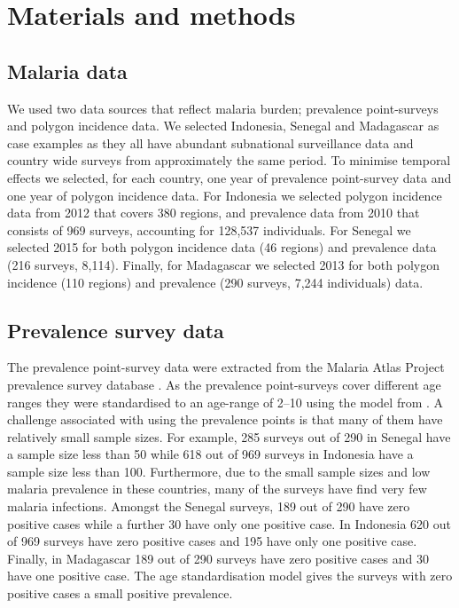 \documentclass[10pt,letterpaper]{article}
\begin{document}
\section*{Materials and methods}


\subsection*{Malaria data}

We used two data sources that reflect malaria burden; prevalence point-surveys and polygon incidence data.
We selected Indonesia, Senegal and Madagascar as case examples as they all have abundant subnational surveillance data and country wide surveys from approximately the same period.
To minimise temporal effects we selected, for each country, one year of prevalence point-survey data and one year of polygon incidence data.
For Indonesia we selected polygon incidence data from 2012 that covers 380 regions, and prevalence data from 2010 that consists of 969 surveys, accounting for 128,537 individuals.
For Senegal we selected 2015 for both polygon incidence data (46 regions) and prevalence data (216 surveys, 8,114). %
Finally, for Madagascar we selected 2013 for both polygon incidence (110 regions) and prevalence (290 surveys, 7,244 individuals) data.



\subsection*{Prevalence survey data}

The prevalence point-survey data were extracted from the Malaria Atlas Project prevalence survey database \cite{bhatt2015effect, guerra2007assembling, gething2011new}.
As the prevalence point-surveys cover different age ranges they were standardised to an age-range of 2--10 using the model from \cite{smith2007standardizing}.
A challenge associated with using the prevalence points is that many of them have relatively small sample sizes.
For example, 285 surveys out of 290 in Senegal have a sample size less than 50 while 618 out of 969 surveys in Indonesia have a sample size less than 100.
Furthermore, due to the small sample sizes and low malaria prevalence in these countries, many of the surveys have find very few malaria infections.
Amongst the Senegal surveys, 189 out of 290 have zero positive cases while a further 30 have only one positive case.
In Indonesia 620 out of 969 surveys have zero positive cases and 195 have only one positive case.
Finally, in Madagascar 189 out of 290 surveys have zero positive cases and 30 have one positive case.
The age standardisation model gives the surveys with zero positive cases a small positive prevalence.
\end{document}
